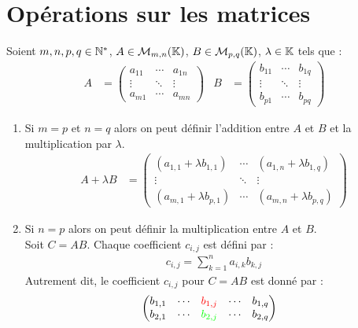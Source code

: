 \section{Opérations sur les matrices}
\begin{definition}
	Soient $m, n, p, q \in \mathbb{N}^*$, $A \in \mathcal{M}_{m, n}(\mathbb{K})$, $B \in \mathcal{M}_{p, q}(\mathbb{K})$, $\lambda  \in \mathbb{K}$ tels que :
	\begin{align*}
		A &=
		\begin{pmatrix}
			a_{11} & \cdots & a_{1n} \\
			\vdots & \ddots & \vdots \\
			a_{m1} & \cdots & a_{mn}
		\end{pmatrix}
		&
		B &= 
		\begin{pmatrix}
			b_{11} & \cdots & b_{1q} \\
			\vdots & \ddots & \vdots \\
			b_{p1} & \cdots & b_{pq}
		\end{pmatrix}
	\end{align*}
	\begin{enumerate}
		\item Si $m = p$ et $n = q$ alors on peut définir l'addition entre $A$ et $ B$ et la multiplication par $\lambda$.
		\begin{align*}
			A + \lambda B &= 
			\begin{pmatrix}
				(a_{1,1} + \lambda b_{1,1}) & \cdots & (a_{1,n} + \lambda b_{1,q}) \\
				\vdots & \ddots & \vdots \\
				(a_{m,1} + \lambda b_{p,1}) & \cdots & (a_{m,n} + \lambda b_{p,q})
			\end{pmatrix}
		\end{align*}
		\item Si $n = p$ alors on peut définir la multiplication entre $A$ et $B$.\\
		Soit $C = AB$. Chaque coefficient $c_{i,j}$ est défini par :
		\begin{align*}
			c_{i,j} = \sum_{k=1}^{n} a_{i,k} b_{k,j}
		\end{align*}
        Autrement dit, le coefficient $c_{i,j}$ pour $C = AB$ est donné par :
        \begin{align*}
            &\begin{pmatrix}
                b_{1,1} & \cdots & \color{red}b_{1,j} & \cdots & b_{1,q} \\
                b_{2,1} & \cdots & \color{green}b_{2,j} & \cdots & b_{2,q} \\

\end{pmatrix}
\end{align*}
\end{enumerate}
\end{definition}
